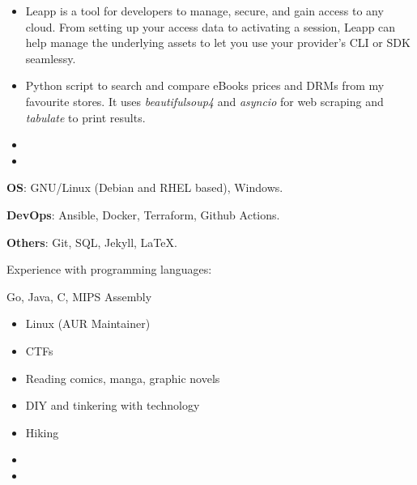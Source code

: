 \begin{itemize}
\item Leapp is a tool for developers to manage, secure, and gain access to any cloud. From setting up your access data to activating a session, Leapp can help manage the underlying assets to let you use your provider's CLI or SDK seamlessy.
\end{itemize}
\smallskip
\smallskip
{}
\begin{itemize}
\item Python script to search and compare eBooks prices and DRMs from my favourite stores. It uses \textit{beautifulsoup4} and \textit{asyncio} for web scraping and \textit{tabulate} to print results.
\end{itemize}
\smallskip
\smallskip

\begin{itemize}
 \item {}
 \item {}
\end{itemize}
\smallskip
\begin{description}
 \item \textbf{OS}: GNU/Linux (Debian and RHEL based), Windows.
 \item \textbf{DevOps}: Ansible, Docker, Terraform, Github Actions.
 \item \textbf{Others}: Git, SQL, Jekyll, LaTeX.
 \item Experience with programming languages: 
 \item    Go, Java, C, MIPS Assembly
\end{description}

\begin{itemize}
\item Linux (AUR Maintainer)
\item CTFs
\end{itemize}
\smallskip
{}
\begin{itemize}
\item Reading comics, manga, graphic novels
\item DIY and tinkering with technology
\item Hiking
\end{itemize}


\begin{itemize}
 \item {}
 \item {}
\end{itemize}
